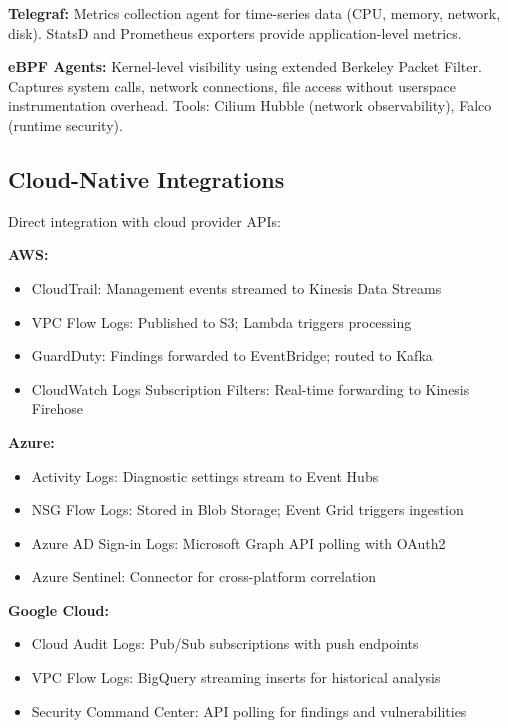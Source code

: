 \textbf{Telegraf:} Metrics collection agent for time-series data (CPU, memory, network, disk). StatsD and Prometheus exporters provide application-level metrics.

\textbf{eBPF Agents:} Kernel-level visibility using extended Berkeley Packet Filter. Captures system calls, network connections, file access without userspace instrumentation overhead. Tools: Cilium Hubble (network observability), Falco (runtime security).

\subsection{Cloud-Native Integrations}
Direct integration with cloud provider APIs:

\textbf{AWS:}
\begin{itemize}
    \item CloudTrail: Management events streamed to Kinesis Data Streams
    \item VPC Flow Logs: Published to S3; Lambda triggers processing
    \item GuardDuty: Findings forwarded to EventBridge; routed to Kafka
    \item CloudWatch Logs Subscription Filters: Real-time forwarding to Kinesis Firehose
\end{itemize}

\textbf{Azure:}
\begin{itemize}
    \item Activity Logs: Diagnostic settings stream to Event Hubs
    \item NSG Flow Logs: Stored in Blob Storage; Event Grid triggers ingestion
    \item Azure AD Sign-in Logs: Microsoft Graph API polling with OAuth2
    \item Azure Sentinel: Connector for cross-platform correlation
\end{itemize}

\textbf{Google Cloud:}
\begin{itemize}
    \item Cloud Audit Logs: Pub/Sub subscriptions with push endpoints
    \item VPC Flow Logs: BigQuery streaming inserts for historical analysis
    \item Security Command Center: API polling for findings and vulnerabilities
\end{itemize}

